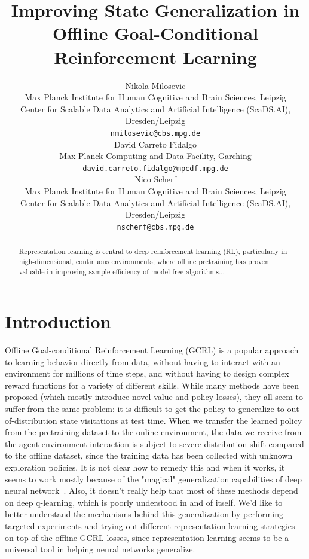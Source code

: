 \documentclass{article}
\title{Improving State Generalization in Offline Goal-Conditional Reinforcement Learning}
\author{Nikola Milosevic \\
Max Planck Institute for Human Cognitive and Brain Sciences, Leipzig\\
Center for Scalable Data Analytics and Artificial Intelligence (ScaDS.AI), Dresden/Leipzig\\
\texttt{nmilosevic@cbs.mpg.de} \\
\And
David Carreto Fidalgo \\
Max Planck Computing and Data Facility, Garching\\
\texttt{david.carreto.fidalgo@mpcdf.mpg.de} \\
\And
Nico Scherf \\
Max Planck Institute for Human Cognitive and Brain Sciences, Leipzig\\
Center for Scalable Data Analytics and Artificial Intelligence (ScaDS.AI), Dresden/Leipzig\\
\texttt{nscherf@cbs.mpg.de} \\
}
\theoremstyle{plain}
\theoremstyle{definition}
\theoremstyle{remark}
\begin{document}
\maketitle

\begin{abstract}
Representation learning is central to deep reinforcement learning (RL), particularly in high-dimensional, continuous environments, where offline pretraining has proven valuable in improving sample efficiency of model-free algorithms...
\end{abstract}


\section{Introduction} 
Offline Goal-conditional Reinforcement Learning (GCRL) is a popular approach to learning behavior directly from data, without having to interact with an environment for millions of time steps, and without having to design complex reward functions for a variety of different skills. 
While many methods have been proposed (which mostly introduce novel value and policy losses), they all seem to suffer from the same problem: it is difficult to get the policy to generalize to out-of-distribution state visitations at test time. 
When we transfer the learned policy from the pretraining dataset to the online environment, the data we receive from the agent-environment interaction is subject to severe distribution shift compared to the offline dataset, since the training data has been collected with unknown exploration policies. 
It is not clear how to remedy this and when it works, it seems to work mostly because of the "magical" generalization capabilities of deep neural network~\cite{park2024value}. Also, it doesn't really help that most of these methods depend on deep q-learning, which is poorly understood in and of itself. 
We'd like to better understand the mechanisms behind this generalization by performing targeted experiments and trying out different representation learning strategies on top of the offline GCRL losses, since representation learning seems to be a universal tool in helping neural networks generalize. 
\end{document}
